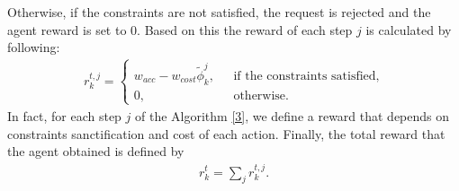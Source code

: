 \documentclass[20pt,twocolumn]{IEEEtran}
\begin{document}
Otherwise, if the constraints are not satisfied, the request is rejected and the agent reward is set to $0$. Based on this the reward of each step $j$ is calculated by following:
\begin{align}
r^{t,j}_{k}=\begin{cases}
w_{acc}-w_{cost}\tilde{\phi}^{j}_{k},~~~ &\text{if the constraints  satisfied},
\\
0,  ~~~~~~~~~~ &\text{otherwise}.
\end{cases}
\label{reward_f}
\end{align}
In fact,  for each step $j$ of the Algorithm \ref{3}, we define a reward that depends on constraints sanctification and cost of each action. Finally, the total reward that the agent obtained  is defined by
\begin{align}
r^{t}_{k}=\sum_{j}r^{t,j}_{k}.
\end{align}
\begin{algorithm}
	\tiny
	\renewcommand{\arraystretch}{10}
	\caption{DQN-based NFV-RA algorithm for dynamic routing and function placement}
	\label{3}
\end{algorithm}
\end{document}
